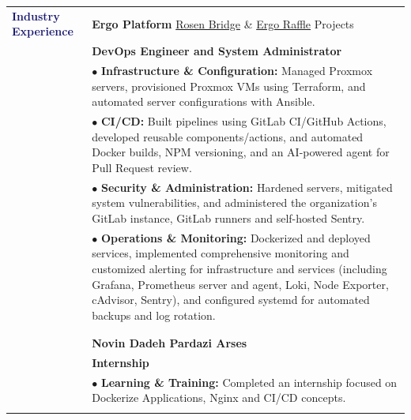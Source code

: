 \documentclass[letterpaper, 11pt]{article}
\begin{document}
\begin{longtable}{p{1.7in}p{5.1in}}

{\textcolor{MidnightBlue}{\textbf{\fontsize{12.6pt}{15pt}\selectfont Industry Experience}}} 
& {\textbf{Ergo Platform}} \href{https://github.com/rosen-bridge/}{Rosen Bridge} \& \href{https://github.com/ergoraffle/}{Ergo Raffle} Projects \hfill \\
& \textbf{DevOps Engineer and System Administrator} \\
& \hspace{0.15in} $\bullet$ \textbf{Infrastructure \& Configuration:} Managed Proxmox servers, provisioned Proxmox VMs using Terraform, and automated server configurations with Ansible. \\
& \hspace{0.15in} $\bullet$ \textbf{CI/CD:} Built pipelines using GitLab CI/GitHub Actions, developed reusable components/actions, and automated Docker builds, NPM versioning, and an AI-powered agent for Pull Request review. \\
& \hspace{0.15in} $\bullet$ \textbf{Security \& Administration:} Hardened servers, mitigated system vulnerabilities, and administered the organization's GitLab instance, GitLab runners and self-hosted Sentry. \\
& \hspace{0.15in} $\bullet$ \textbf{Operations \& Monitoring:} Dockerized and deployed services, implemented comprehensive monitoring and customized alerting for infrastructure and services (including Grafana, Prometheus server and agent, Loki, Node Exporter, cAdvisor, Sentry), and configured systemd for automated backups and log rotation. \\
& \\
& \\
& {\textbf{Novin Dadeh Pardazi Arses}} \hfill \\
& \textbf{Internship} \\
& \hspace{0.15in} $\bullet$ \textbf{Learning \& Training:} Completed an internship focused on Dockerize Applications, Nginx and CI/CD concepts. \\
& \\



\end{longtable}
\end{document}

